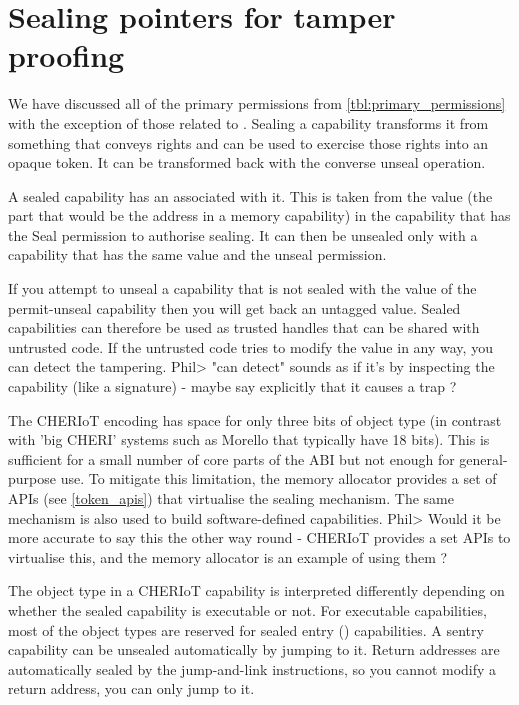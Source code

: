 \section[label=sealing_intro]{Sealing pointers for tamper proofing}

We have discussed all of the primary permissions from \ref{tbl:primary_permissions} with the exception of those related to .
Sealing a capability transforms it from something that conveys rights and can be used to exercise those rights into an opaque token.
It can be transformed back with the converse unseal operation.

A sealed capability has an  associated with it.
This is taken from the value (the part that would be the address in a memory capability) in the capability that has the Seal permission to authorise sealing.
It can then be unsealed only with a capability that has the same value and the unseal permission.

If you attempt to unseal a capability that is not sealed with the value of the permit-unseal capability then you will get back an untagged value.
Sealed capabilities can therefore be used as trusted handles that can be shared with untrusted code.
If the untrusted code tries to modify the value in any way, you can detect the tampering.
Phil> "can detect" sounds as if it's by inspecting the capability (like a signature) - maybe say explicitly that it causes a trap ? 

The CHERIoT encoding has space for only three bits of object type (in contrast with 'big CHERI' systems such as Morello that typically have 18 bits).
This is sufficient for a small number of core parts of the ABI but not enough for general-purpose use.
To mitigate this limitation, the memory allocator provides a set of APIs (see \ref{token_apis}) that virtualise the sealing mechanism.
The same mechanism is also used to build software-defined capabilities.
Phil> Would it be more accurate to say this the other way round - CHERIoT provides a set APIs to virtualise this, and the memory allocator is an example of using them ?

The object type in a CHERIoT capability is interpreted differently depending on whether the sealed capability is executable or not.
For executable capabilities, most of the object types are reserved for sealed entry () capabilities.
A sentry capability can be unsealed automatically by jumping to it.
Return addresses are automatically sealed by the jump-and-link instructions, so you cannot modify a return address, you can only jump to it.


